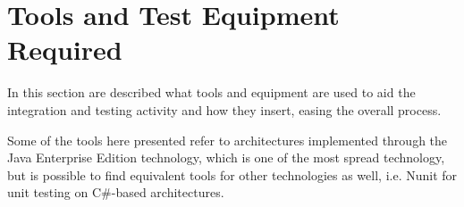 \section{Tools and Test Equipment Required}

In this section are described what tools and equipment are used to aid the integration and testing activity and how they insert, easing the overall process.

Some of the tools here presented refer to architectures implemented through the Java Enterprise Edition technology, which is one of the most spread technology, but is possible to find equivalent tools for other technologies as well, i.e. Nunit for unit testing on C\#-based architectures.

	
	
